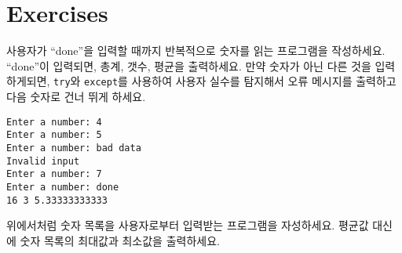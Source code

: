 \section{Exercises}

\begin{ex}
사용자가 ``done''을 입력할 때까지 반복적으로 숫자를 읽는 프로그램을 작성하세요.
``done''이 입력되면, 총계, 갯수, 평균을 출력하세요.
만약 숫자가 아닌 다른 것을 입력하게되면, {\tt try}와 {\tt except}를 사용하여 사용자 실수를 탐지해서
오류 메시지를 출력하고 다음 숫자로 건너 뛰게 하세요.

\begin{verbatim}
Enter a number: 4
Enter a number: 5
Enter a number: bad data
Invalid input
Enter a number: 7
Enter a number: done
16 3 5.33333333333
\end{verbatim}
\end{ex}

\begin{ex}

위에서처럼 숫자 목록을 사용자로부터 입력받는 프로그램을 자성하세요. 평균값 대신에 숫자 목록의 최대값과 최소값을 출력하세요.
\end{ex}


